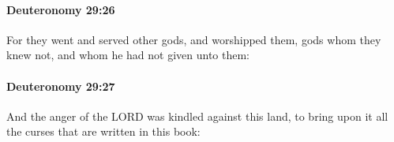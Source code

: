 		\paragraph{Deuteronomy 29:26} %
			\label{DEUTERONOMY-29-26}

			For they went and served other gods, and worshipped them, gods whom they knew not, and whom he had not given unto them:


		\paragraph{Deuteronomy 29:27} %
			\label{DEUTERONOMY-29-27}

			And the anger of the LORD was kindled against this land, to bring upon it all the curses that are written in this book:


